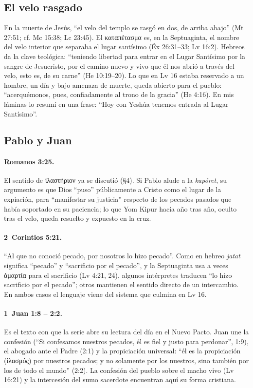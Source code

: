 \documentclass[11pt,letterpaper]{article}
\newcommand{\grc}[1]{\foreignlanguage{ancientgreek}{#1}}
\begin{document}
\subsection{El velo rasgado}
En la muerte de Jesús, ``el velo del templo se rasgó en dos, de arriba abajo'' (Mt 27:51; cf. Mc 15:38; Lc 23:45). El \grc{καταπέτασμα} es, en la Septuaginta, el nombre del velo interior que separaba el lugar santísimo (Éx 26:31--33; Lv 16:2). Hebreos da la clave teológica: ``teniendo libertad para entrar en el Lugar Santísimo por la sangre de Jesucristo, por el camino nuevo y vivo que él nos abrió a través del velo, esto es, de su carne'' (He 10:19--20). Lo que en Lv 16 estaba reservado a un hombre, un día y bajo amenaza de muerte, queda abierto para el pueblo: ``acerquémonos, pues, confiadamente al trono de la gracia'' (He 4:16). En mis láminas lo resumí en una frase: ``Hoy con Yeshúa tenemos entrada al Lugar Santísimo''.

\subsection{Pablo y Juan}
\paragraph{Romanos 3:25.} El sentido de \grc{ἱλαστήριον} ya se discutió (§4). Si Pablo alude a la \emph{kapóret}, su argumento es que Dios ``puso'' públicamente a Cristo como el lugar de la expiación, para ``manifestar su justicia'' respecto de los pecados pasados que había soportado en su paciencia; lo que Yom Kipur hacía año tras año, oculto tras el velo, queda resuelto y expuesto en la cruz.

\paragraph{2~Corintios 5:21.} ``Al que no conoció pecado, por nosotros lo hizo pecado''. Como en hebreo \emph{jatat} significa ``pecado'' y ``sacrificio por el pecado'', y la Septuaginta usa a veces \grc{ἁμαρτία} para el sacrificio (Lv 4:21, 24), algunos intérpretes traducen ``lo hizo sacrificio por el pecado''; otros mantienen el sentido directo de un intercambio. En ambos casos el lenguaje viene del sistema que culmina en Lv 16.

\paragraph{1~Juan 1:8 -- 2:2.} Es el texto con que la serie abre su lectura del día en el Nuevo Pacto. Juan une la confesión (``Si confesamos nuestros pecados, él es fiel y justo para perdonar'', 1:9), el abogado ante el Padre (2:1) y la propiciación universal: ``él es la propiciación (\grc{ἱλασμός}) por nuestros pecados; y no solamente por los nuestros, sino también por los de todo el mundo'' (2:2). La confesión del pueblo sobre el macho vivo (Lv 16:21) y la intercesión del sumo sacerdote encuentran aquí su forma cristiana.
\end{document}
